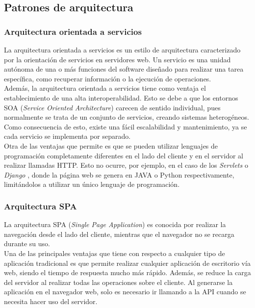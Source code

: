 \subsection{Patrones de arquitectura}

\subsubsection{Arquitectura orientada a servicios}

La arquitectura orientada a servicios \cite{soa} es un estilo de arquitectura caracterizado por la orientación de servicios en servidores web. Un servicio es una unidad autónoma de una o más funciones del software diseñado para realizar una tarea específica, como recuperar información o la ejecución de operaciones.
\\

Además, la arquitectura orientada a servicios tiene como ventaja el establecimiento de una alta interoperabilidad. Esto se debe a que los entornos SOA ({\it Service Oriented Architecture}) carecen de sentido individual, pues normalmente se trata de un conjunto de servicios, creando sistemas heterogéneos. Como consecuencia de esto, existe una fácil escalabilidad y mantenimiento, ya se cada servicio se implementa por separado.
\\

Otra de las ventajas que permite es que se pueden utilizar lenguajes de programación completamente diferentes en el lado del cliente y en el servidor al realizar llamadas HTTP. Esto no ocurre, por ejemplo, en el caso de los {\it Servlets} \cite{servlet} o {\it Django} \cite{django}, donde la página web se genera en JAVA o Python respectivamente, limitándolos a utilizar un único lenguaje de programación.

\subsubsection{Arquitectura SPA}

La arquitectura SPA ({\it Single Page Application}) \cite{spa} es conocida por realizar la navegación desde el lado del cliente, mientras que el navegador no se recarga durante su uso. 
\\

Una de las principales ventajas que tiene con respecto a cualquier tipo de aplicación tradicional es que permite realizar cualquier aplicación de escritorio vía web, siendo el tiempo de respuesta mucho más rápido. Además, se reduce la carga del servidor al realizar todas las operaciones sobre el cliente. Al generarse la aplicación en el navegador web, solo es necesario ir llamando a la API cuando se necesita hacer uso del servidor.